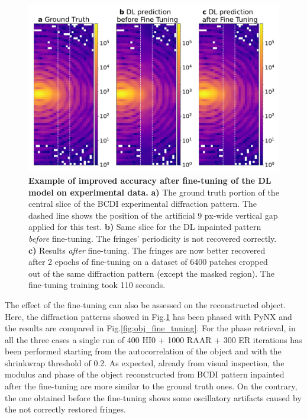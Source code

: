 \begin{figure}[H]
    \centering
    \includegraphics[width=\textwidth]{figures/Inpainting/FineTuning.pdf}
    \caption{\textbf{Example of improved accuracy after fine-tuning of the DL model on experimental data.} \textbf{a)} 
    The ground truth portion of the central slice of the BCDI experimental diffraction pattern. The dashed line 
    shows the position of the artificial 9 px-wide vertical gap applied for this test. \textbf{b)} Same slice 
    for the DL inpainted pattern \textit{before} fine-tuning. The fringes' periodicity is not recovered correctly. 
    \textbf{c)} Results \textit{after} fine-tuning. The fringes are now better recovered after 2 epochs of fine-tuning 
    on a dataset of 6400 patches cropped out of the same diffraction pattern (except the masked region). The fine-tuning 
    training took 110 seconds. }
    \label{fig:fine_tuning}
\end{figure}

The effect of the fine-tuning can also be assessed on the reconstructed object. Here, the diffraction patterns showed 
in Fig.\ref{fig:fine_tuning} has been phased with PyNX and the results are compared in Fig.\ref{fig:obj_fine_tuning}. 
For the phase retrieval, in all the three cases a single run of 400 HI0 + 1000 RAAR + 300 ER iterations has been performed starting 
from the autocorrelation of the object and with the shrinkwrap threshold of 0.2.  
As expected, already from visual inspection, the modulus and phase of the object reconstructed from BCDI pattern inpainted 
after the fine-tuning are more similar to the ground truth ones. On the contrary, the one obtained before the fine-tuning 
shows some oscillatory artifacts caused by the not correctly restored fringes. 


